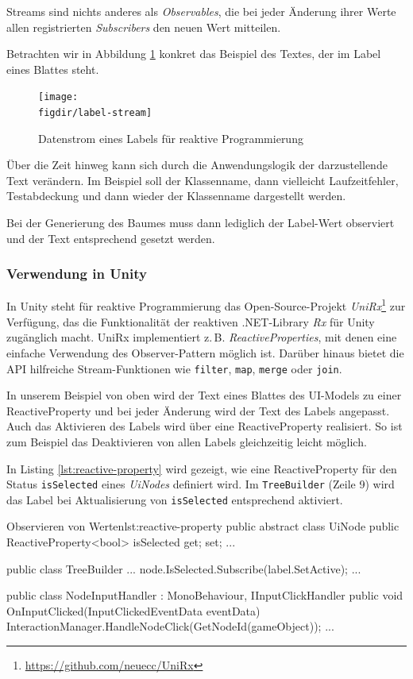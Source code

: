 Streams sind nichts anderes als \textit{Observables}, die bei jeder Änderung ihrer Werte allen registrierten \textit{Subscribers} den neuen Wert mitteilen.

Betrachten wir in Abbildung \ref{fig:label-stream} konkret das Beispiel des Textes, der im Label eines Blattes steht.

\begin{figure}[htb]
  \texttt{[image: \\figdir/label-stream]}
  \caption{Datenstrom eines Labels für reaktive Programmierung}
  \label{fig:label-stream}
\end{figure}

Über die Zeit hinweg kann sich durch die Anwendungslogik der darzustellende Text verändern. Im Beispiel soll der Klassenname, dann vielleicht Laufzeitfehler, Testabdeckung und dann wieder der Klassenname dargestellt werden.

Bei der Generierung des Baumes muss dann lediglich der Label-Wert observiert und der Text entsprechend gesetzt werden.

\subsubsection*{Verwendung in Unity}

In Unity steht für reaktive Programmierung das Open-Source-Projekt \textit{UniRx}\footnote{\url{https://github.com/neuecc/UniRx}} zur Verfügung, das die Funktionalität der reaktiven .NET-Library \textit{Rx} für Unity zugänglich macht. UniRx implementiert z.\,B. \textit{ReactiveProperties}, mit denen eine einfache Verwendung des Observer-Pattern möglich ist. Darüber hinaus bietet die API hilfreiche Stream-Funktionen wie \texttt{filter}, \texttt{map}, \texttt{merge} oder \texttt{join}.

In unserem Beispiel von oben wird der Text eines Blattes des UI-Models zu einer ReactiveProperty und bei jeder Änderung wird der Text des Labels angepasst. Auch das Aktivieren des Labels wird über eine ReactiveProperty realisiert. So ist zum Beispiel das Deaktivieren von allen Labels gleichzeitig leicht möglich.

In Listing \ref{lst:reactive-property} wird gezeigt, wie eine ReactiveProperty für den Status \texttt{isSelected} eines \textit{UiNodes} definiert wird. Im \texttt{TreeBuilder} (Zeile 9) wird das Label bei Aktualisierung von \texttt{isSelected} entsprechend aktiviert.

\begin{codesnippet}{Observieren von Werten}{lst:reactive-property}
public abstract class UiNode
{
    public ReactiveProperty<bool> isSelected { get; set; }
    ...
}

public class TreeBuilder {
    ...
    node.IsSelected.Subscribe(label.SetActive);
    ...
}

public class NodeInputHandler : MonoBehaviour, IInputClickHandler
{
    public void OnInputClicked(InputClickedEventData eventData)
    {
        InteractionManager.HandleNodeClick(GetNodeId(gameObject));
    }
    ...
}
\end{codesnippet}

